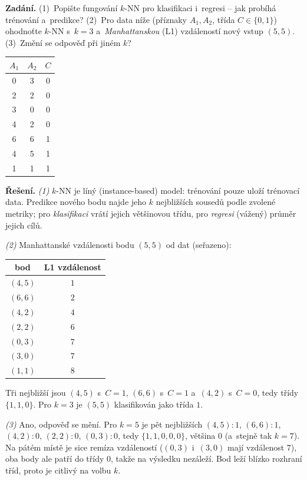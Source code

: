 \begin{priklad}
\par
\textbf{Zadání.} (1)~Popište fungování $k$-NN pro klasifikaci i~regresi -- jak probíhá trénování a~predikce? (2)~Pro data níže (příznaky $A_1,A_2$, třída $C\in\{0,1\}$) ohodnoťte $k$-NN s~$k=3$ a~\emph{Manhattanskou} (L1) vzdáleností nový vstup $(5,5)$. (3)~Změní se odpověď při jiném $k$?

\smallskip
\begin{center}\small
\begin{tabular}{ccc}
\toprule
$A_1$ & $A_2$ & $C$ \\
\midrule
0 & 3 & 0 \\ 2 & 2 & 0 \\ 3 & 0 & 0 \\ 4 & 2 & 0 \\
6 & 6 & 1 \\ 4 & 5 & 1 \\ 1 & 1 & 1 \\
\bottomrule
\end{tabular}
\end{center}

\smallskip
\textbf{Řešení.} \emph{(1)} $k$-NN je líný (instance-based) model: trénování pouze uloží trénovací data. Predikce nového bodu najde jeho $k$ nejbližších sousedů podle zvolené metriky; pro \emph{klasifikaci} vrátí jejich většinovou třídu, pro \emph{regresi} (vážený) průměr jejich cílů.

\emph{(2)} Manhattanské vzdálenosti bodu $(5,5)$ od dat (seřazeno):
\begin{center}\small
\begin{tabular}{cc}
\toprule
bod & L1 vzdálenost \\
\midrule
$(4,5)$ & $1$ \\ $(6,6)$ & $2$ \\ $(4,2)$ & $4$ \\ $(2,2)$ & $6$ \\
$(0,3)$ & $7$ \\ $(3,0)$ & $7$ \\ $(1,1)$ & $8$ \\
\bottomrule
\end{tabular}
\end{center}
Tři nejbližší jsou $(4,5)$ s~$C{=}1$, $(6,6)$ s~$C{=}1$ a~$(4,2)$ s~$C{=}0$, tedy třídy $\{1,1,0\}$. Pro $k=3$ je $(5,5)$ klasifikován jako třída $\boxed{1}$.

\emph{(3)} Ano, odpověď se mění. Pro $k=5$ je pět nejbližších $(4,5){:}1$, $(6,6){:}1$, $(4,2){:}0$, $(2,2){:}0$, $(0,3){:}0$, tedy $\{1,1,0,0,0\}$, většina $\boxed{0}$ (a~stejně tak $k=7$). Na pátém místě je sice remíza vzdáleností ($(0,3)$ i~$(3,0)$ mají vzdálenost $7$), oba body ale patří do třídy $0$, takže na výsledku nezáleží. Bod leží blízko rozhraní tříd, proto je citlivý na volbu $k$.
\end{priklad}
